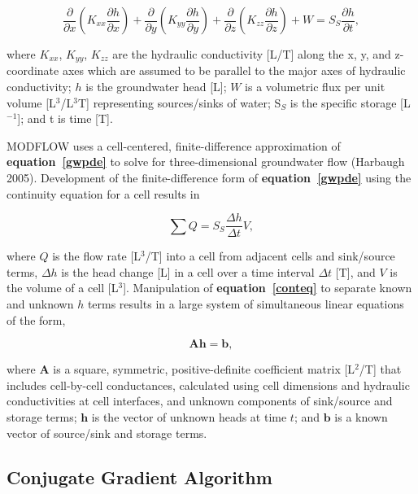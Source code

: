 \documentclass[12pt]{article}
\begin{document}
\begin{equation}
	\label{gwpde}
	\frac{\partial}{\partial x} \left( K_{xx} \frac{\partial h}{\partial x} \right) + 
	\frac{\partial}{\partial y} \left( K_{yy} \frac{\partial h}{\partial y} \right) + 
	\frac{\partial}{\partial z} \left( K_{zz} \frac{\partial h}{\partial z} \right) + 
	W = S_{S} \frac{\partial h}{\partial t} ,
\end{equation}

\noindent
where  $K_{xx}$, $K_{yy}$, $K_{zz}$ are the hydraulic conductivity [L/T] along the x, y, and z-coordinate axes which are assumed to be parallel to the major axes of hydraulic conductivity; $h$ is the groundwater head [L]; $W$ is a volumetric flux per unit volume [L$^{3}$/L$^{3}$T] representing sources/sinks of water; S$_{S}$ is the specific storage [L$^{-1}$]; and t is time [T].

MODFLOW uses a cell-centered, finite-difference approximation of \textbf{equation~\ref{gwpde}} to solve for three-dimensional groundwater flow (Harbaugh 2005). Development of the finite-difference form of \textbf{equation~\ref{gwpde}} using the continuity equation for a cell results in

\begin{equation}
	\label{conteq}
	\sum Q = S_{S} \frac{\Delta h}{\Delta t} V,
\end{equation}

\noindent
where $Q$ is the flow rate [L$^{3}$/T] into a cell from adjacent cells and sink/source terms, $\Delta h$ is the head change [L] in a cell over a time interval $\Delta t$ [T], and $V$ is the volume of a cell [L$^{3}$]. Manipulation of \textbf{equation~\ref{conteq}} to separate known and unknown $h$ terms results in a large system of simultaneous linear equations of the form, 

\begin{equation}
	\label{lineareq}
	\mathbf{Ah} = \mathbf{b},
\end{equation}

\noindent
where $\mathbf{A}$ is a  square, symmetric, positive-definite coefficient matrix [L$^{2}$/T] that includes cell-by-cell conductances, calculated using cell dimensions and hydraulic conductivities at cell interfaces, and unknown components of sink/source and storage terms; $\mathbf{h}$ is the vector of unknown heads at time $t$; and $\mathbf{b}$ is a known vector of source/sink and storage terms.

\subsection*{Conjugate Gradient Algorithm}
\end{document}
